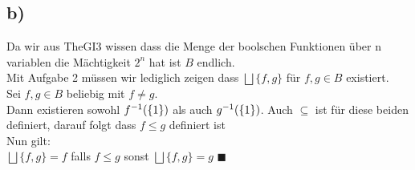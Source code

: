 \subsection*{b)}
Da wir aus TheGI3 wissen dass die Menge der boolschen Funktionen über n variablen die Mächtigkeit $2^n$ hat ist $B$ endlich.\\
Mit Aufgabe 2 müssen wir lediglich zeigen dass $ \bigsqcup \{f,g\}$ für $f,g \in B$ existiert.\\
Sei $f,g \in B$ beliebig mit $f \neq g$. \\
Dann existieren sowohl $f^{-1}(\{1\})$ als auch $g^{-1}(\{1\})$. Auch $\subseteq$ ist für diese beiden definiert, darauf folgt dass $f \leq g$ definiert ist\\
Nun gilt:\\
$ \bigsqcup \{f,g\}= f$ falls $f \leq g$ sonst 
$ \bigsqcup \{f,g\}= g$ $\blacksquare$


